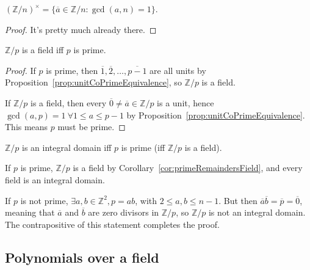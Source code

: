 \begin{corollary}
	${(\mathbb{Z} / n)}^{\times} = \{ \overline{a} \in \mathbb{Z} / n: \gcd(a, n) = 1 \}$.
\end{corollary}

\begin{proof}
	It's pretty much already there.
\end{proof}

\begin{corollary}\label{cor:primeRemaindersField}
	$\mathbb{Z} / p$ is a field iff $p$ is prime.
\end{corollary}

\begin{proof}
	If $p$ is prime, then $\overline{1}, \overline{2}, \dots, \overline{p - 1}$ are all units by Proposition~\ref{prop:unitCoPrimeEquivalence}, so $\mathbb{Z} / p$ is a field.

	If $\mathbb{Z} / p$ is a field, then every $\overline{0} \ne \overline{a} \in \mathbb{Z} / p$ is a unit, hence $\gcd(a, p) = 1 \ \forall 1 \le a \le p - 1$ by Proposition~\ref{prop:unitCoPrimeEquivalence}. This means $p$ must be prime.
\end{proof}

\begin{proposition}
	$\mathbb{Z} / p$ is an integral domain iff $p$ is prime (iff $\mathbb{Z} / p$ is a field).
\end{proposition}

\begin{proposition}
	If $p$ is prime, $\mathbb{Z} / p$ is a field by Corollary~\ref{cor:primeRemaindersField}, and every field is an integral domain.

	If $p$ is not prime, $\exists a, b \in \mathbb{Z}^2, p = ab$, with $2 \le a, b \le n - 1$. But then $\overline{a} \overline{b} = \overline{p} = \overline{0}$, meaning that $\overline{a}$ and $\overline{b}$ are zero divisors in $\mathbb{Z} / p$, so $\mathbb{Z} / p$ is not an integral domain. The contrapositive of this statement completes the proof.
\end{proposition}

\subsection{Polynomials over a field}

